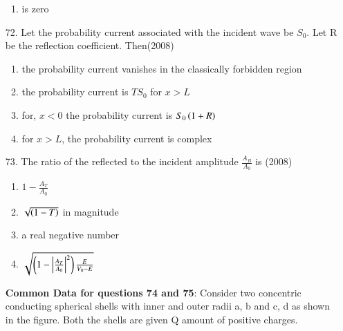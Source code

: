 \documentclass[journal]{IEEEtran}
\begin{document}
\begin{enumerate}
\begin{enumerate}[label=(\Alph*)]
        \item  is zero
      \end{enumerate}
    \item[72.]  Let the probability current associated with the incident wave be $S_0$. Let R be the reflection coefficient. Then\hfill (2008)
      \begin{enumerate}[label=(\Alph*)]
        \item the probability current vanishes in the classically forbidden region
        \item the probability current is $TS_0$ for $x > L$
        \item for, $x < 0$ the probability current is $S_0\left(1 + R\right)$
        \item  for $x > L$, the probability current is complex
      \end{enumerate}
    \item[73.] The ratio of the reflected to the incident amplitude $\frac{A_B}{A_0}$ is \hfill (2008)
      \begin{enumerate}[label = (\Alph*)]
        \item $1-\frac{A_T}{A_0}$
        \item $\sqrt{\left(1-T\right)}$ in magnitude
        \item a real negative number
        \item $\sqrt{\left(1-\left\vert\frac{A_T}{A_0}\right\vert^2\right)\frac{E}{V_0 - E}}$
      \end{enumerate}
    \textbf{Common Data for questions 74 and 75}: Consider two concentric conducting spherical shells with inner and outer radii a, b and c, d as shown in the figure. Both the shells are given Q amount of positive charges.
    \begin{figure}[!ht]
      \centering
\end{figure}
\end{enumerate}
\end{document}
